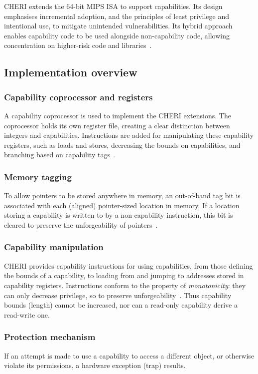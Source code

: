 \documentclass[dissertation.tex]{subfiles}
\begin{document}
CHERI extends the 64-bit MIPS ISA to support capabilities.
Its design emphasises incremental adoption, and the principles of least
privilege and intentional use, to mitigate unintended vulnerabilities.
Its hybrid approach enables capability code to be used alongside
non-capability code, allowing concentration on higher-risk code and
libraries~\cite{cheri-v6}.

\subsection{Implementation overview}

\subsubsection{Capability coprocessor and registers}
A capability coprocessor is used to implement the CHERI extensions.
The coprocessor holds its own register file, creating a clear
distinction between integers and capabilities.
Instructions are added for manipulating these capability registers, such
as loads and stores, decreasing the bounds on capabilities, and
branching based on capability tags~\cite{cheri-risc-2014}.

\subsubsection{Memory tagging}
To allow pointers to be stored anywhere in memory, an out-of-band tag
bit is associated with each (aligned) pointer-sized location in memory.
If a location storing a capability is written to by a non-capability
instruction, this bit is cleared to preserve the unforgeability of
pointers~\cite{cheri-risc-2014}.

\subsubsection{Capability manipulation}
CHERI provides capability instructions for using capabilities, from
those defining the bounds of a capability, to loading from and jumping
to addresses stored in capability registers.
Instructions conform to the property of \emph{monotonicity}: they can
only decrease privilege, so to preserve
unforgeability~\cite{cheri-risc-2014}.
Thus capability bounds (length) cannot be increased, nor can a read-only
capability derive a read-write one.

\subsubsection{Protection mechanism}
If an attempt is made to use a capability to access a different object,
or otherwise violate its permissions, a hardware exception (trap)
results.
\end{document}

